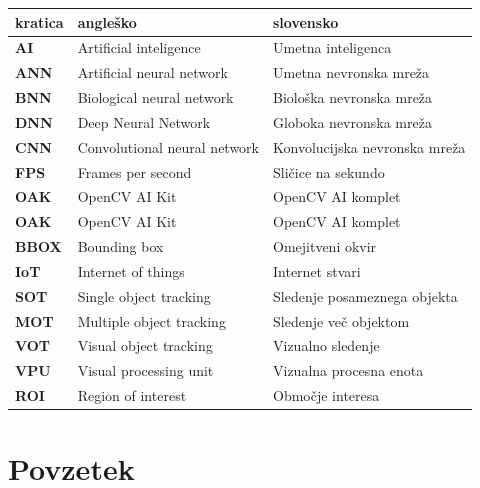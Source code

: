 \documentclass[a4paper,12pt,openright]{book}
\newcommand{\clearemptydoublepage}{\newpage{\pagestyle{empty}\cleardoublepage}}
\begin{document}
\noindent\begin{tabular}{p{}|p{}|p{}}    %
    {\bf kratica} & {\bf angleško}               & {\bf slovensko}               \\ \hline
    {\bf AI}      & Artificial inteligence       & Umetna inteligenca            \\
    {\bf ANN}     & Artificial neural network    & Umetna nevronska mreža        \\
    {\bf BNN}     & Biological neural network    & Biološka nevronska mreža      \\
    {\bf DNN}     & Deep Neural Network          & Globoka nevronska mreža       \\
    {\bf CNN}     & Convolutional neural network & Konvolucijska nevronska mreža \\
    {\bf FPS}     & Frames per second            & Sličice na sekundo            \\
    {\bf OAK}     & OpenCV AI Kit                & OpenCV AI komplet             \\
    {\bf OAK}     & OpenCV AI Kit                & OpenCV AI komplet             \\
    {\bf BBOX}    & Bounding box                 & Omejitveni okvir              \\
    {\bf IoT}     & Internet of things           & Internet stvari               \\
    {\bf SOT}     & Single object tracking       & Sledenje posameznega objekta  \\
    {\bf MOT}     & Multiple object tracking     & Sledenje več objektom         \\
    {\bf VOT}     & Visual object tracking       & Vizualno sledenje             \\
    {\bf VPU}     & Visual processing unit       & Vizualna procesna enota       \\
    {\bf ROI}     & Region of interest           & Območje interesa              \\
\end{tabular}


\clearemptydoublepage

\chapter*{Povzetek}
\end{document}

